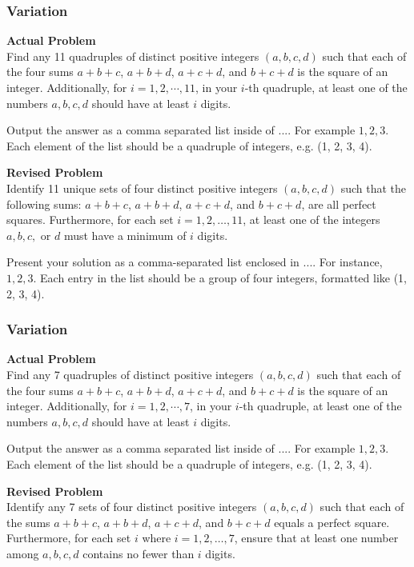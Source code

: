 \subsubsection{Variation}
\textbf{Actual Problem}\\
Find any 11 quadruples of distinct positive integers $(a, b, c, d)$ such that each of the four sums $a+b+c$, $a+b+d$, $a+c+d$, and $b+c+d$ is the square of an integer.
Additionally, for $i = 1, 2, \cdots, 11$, in your $i$-th quadruple, at least one of the numbers $a, b, c, d$ should have at least $i$ digits.

Output the answer as a comma separated list inside of $\boxed{...}$. For example $\boxed{1, 2, 3}$.
Each element of the list should be a quadruple of integers, e.g. (1, 2, 3, 4).

\textbf{Revised Problem}\\
Identify 11 unique sets of four distinct positive integers $(a, b, c, d)$ such that the following sums: $a+b+c$, $a+b+d$, $a+c+d$, and $b+c+d$, are all perfect squares. Furthermore, for each set $i = 1, 2, \ldots, 11$, at least one of the integers $a, b, c,$ or $d$ must have a minimum of $i$ digits.

Present your solution as a comma-separated list enclosed in $\boxed{...}$. For instance, $\boxed{1, 2, 3}$. Each entry in the list should be a group of four integers, formatted like (1, 2, 3, 4).

\subsubsection{Variation}
\textbf{Actual Problem}\\
Find any 7 quadruples of distinct positive integers $(a, b, c, d)$ such that each of the four sums $a+b+c$, $a+b+d$, $a+c+d$, and $b+c+d$ is the square of an integer.
Additionally, for $i = 1, 2, \cdots, 7$, in your $i$-th quadruple, at least one of the numbers $a, b, c, d$ should have at least $i$ digits.

Output the answer as a comma separated list inside of $\boxed{...}$. For example $\boxed{1, 2, 3}$.
Each element of the list should be a quadruple of integers, e.g. (1, 2, 3, 4).

\textbf{Revised Problem}\\
Identify any 7 sets of four distinct positive integers $(a, b, c, d)$ such that each of the sums $a+b+c$, $a+b+d$, $a+c+d$, and $b+c+d$ equals a perfect square. Furthermore, for each set $i$ where $i = 1, 2, \ldots, 7$, ensure that at least one number among $a, b, c, d$ contains no fewer than $i$ digits.

